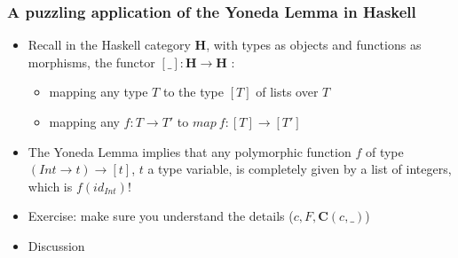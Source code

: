 \documentclass[handout]{beamer}
\newcommand{\bfsf}[1]{{\boldsymbol{#1}}}
\newcommand{\CC}{\bfsf{C}}
\newcommand{\HH}{\bfsf{H}}
\begin{document}
\frame
  {   
    \frametitle{A puzzling application of the Yoneda Lemma in Haskell}\label{Yon:Hask}

 \begin{itemize}[<+->]
\item Recall in the Haskell category $\HH$, with types as objects and 
functions as morphisms, the functor $[\_]:\HH\to\HH$ :
   \begin{itemize}[<+->]
\item mapping any type $T$ to the type $[T]$ of lists over $T$
\item mapping any $f: T\to T'$ to $map~f: [T] \to [T']$
   \end{itemize}
\item The Yoneda Lemma implies that any polymorphic function
$f$ of type $(Int\to t) \to [t]$, $t$ a type variable,
is completely given by a list of integers, which is $f(id_{Int})$!
\item Exercise: make sure you understand the details ($c,F,\CC(c,\_)$) %
\item Discussion
 \end{itemize}

 }
\end{document}
